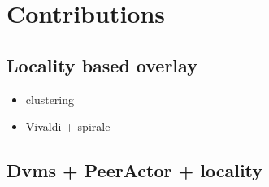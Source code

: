 \section{Contributions}


\subsection{Locality based overlay}

\begin{itemize}
	
	\item clustering
	
	\item Vivaldi + spirale

\end{itemize}

\subsection{Dvms + PeerActor + locality}